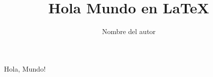 \documentclass {article}
\title{Hola Mundo en LaTeX}
\author{ Nombre del autor }
\begin{document}
\maketitle 
Hola, Mundo!
\end{document}
